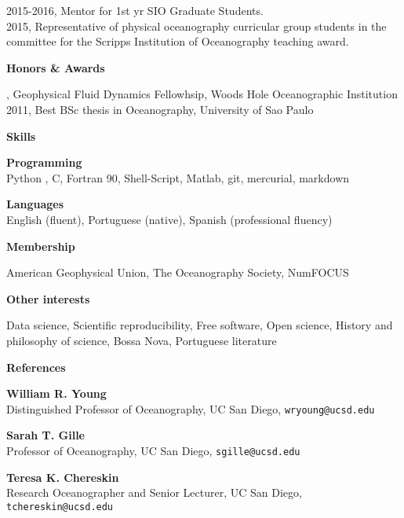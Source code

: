 \documentclass[a4paper,11pt,final]{memoir}
\newcommand{\Sep}{\vspace{1.25em}}
\newcommand{\SmallSep}{\vspace{0.5em}}
\newcommand{\CVSection}[1]
    {\Large\textbf{#1}\par
    \SmallSep\normalsize\normalfont}
\newcommand{\CVItem}[1]
    {\textbf{\color{NavyBlue} #1}}
\begin{document}
2015-2016, Mentor for 1st yr SIO Graduate Students. \\

2015, Representative of physical oceanography curricular group students in the committee for
the Scripps Institution of Oceanography teaching award.





\Sep

\CVSection{Honors \& Awards}
2015, Geophysical Fluid Dynamics Fellowhsip, Woods Hole Oceanographic Institution\\
2011, Best BSc thesis in Oceanography, University of Sao Paulo

\Sep

\CVSection{Skills}

\CVItem{Programming}\\
Python , C, Fortran 90, Shell-Script, Matlab, git, mercurial, markdown

\SmallSep

\CVItem{Languages}\\
English (fluent), Portuguese (native), Spanish (professional fluency)

\Sep

\CVSection{Membership}

 American Geophysical Union, The Oceanography Society, NumFOCUS


\Sep

\CVSection{Other interests}

Data science, Scientific reproducibility, Free software, Open science, History and philosophy of science,
 Bossa Nova, Portuguese literature 

\Sep

\CVSection{References}

\CVItem{William R. Young}\\
Distinguished Professor of Oceanography, UC San Diego, \texttt{wryoung@ucsd.edu}

\SmallSep

\CVItem{Sarah T. Gille}\\
Professor of Oceanography, UC San Diego, \texttt{sgille@ucsd.edu}

\SmallSep

\CVItem{Teresa K. Chereskin}\\
Research Oceanographer and Senior Lecturer, UC San Diego, \texttt{tchereskin@ucsd.edu}
\end{document}
